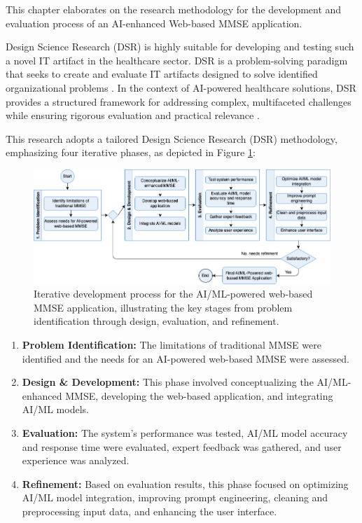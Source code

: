 This chapter elaborates on the research methodology for the development and evaluation process of an AI-enhanced Web-based MMSE application.

Design Science Research (DSR) is highly suitable for developing and testing such a novel IT artifact in the healthcare sector. DSR is a problem-solving paradigm that seeks to create and evaluate IT artifacts designed to solve identified organizational problems \cite{Hevner2004,Peffers2007}. In the context of AI-powered healthcare solutions, DSR provides a structured framework for addressing complex, multifaceted challenges while ensuring rigorous evaluation and practical relevance \cite{Gregor2013}.

This research adopts a tailored Design Science Research (DSR) methodology, emphasizing four iterative phases, as depicted in Figure \ref{fig:mmse-development-process}:

\begin{figure}[h!]
\begin{center}
\includegraphics[width=1\textwidth]{theory/figures/flow.drawio.png}
\caption{Iterative development process for the AI/ML-powered web-based MMSE application, illustrating the key stages from problem identification through design, evaluation, and refinement.}
\label{fig:mmse-development-process}
\end{center}
\end{figure}

\begin{enumerate}
    \item \textbf{Problem Identification:} The limitations of traditional MMSE were identified and the needs for an AI-powered web-based MMSE were assessed.
    \item \textbf{Design \& Development:} This phase involved conceptualizing the AI/ML-enhanced MMSE, developing the web-based application, and integrating AI/ML models.
    \item \textbf{Evaluation:} The system's performance was tested, AI/ML model accuracy and response time were evaluated, expert feedback was gathered, and user experience was analyzed.
    \item \textbf{Refinement:} Based on evaluation results, this phase focused on optimizing AI/ML model integration, improving prompt engineering, cleaning and preprocessing input data, and enhancing the user interface.
\end{enumerate}

